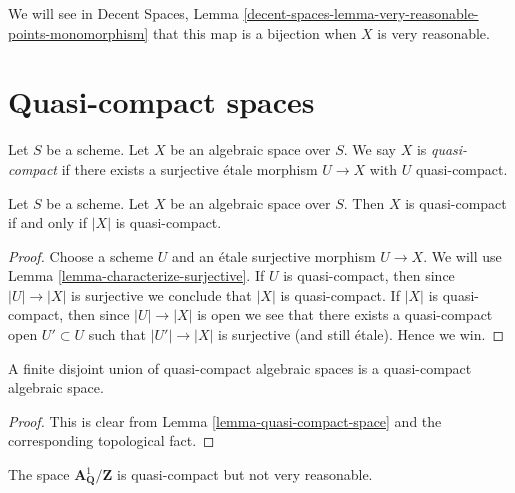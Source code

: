 \noindent
We will see in
Decent Spaces,
Lemma \ref{decent-spaces-lemma-very-reasonable-points-monomorphism}
that this map is a bijection when $X$ is very reasonable.

















\section{Quasi-compact spaces}
\label{section-quasi-compact}

\begin{definition}
\label{definition-quasi-compact}
Let $S$ be a scheme.
Let $X$ be an algebraic space over $S$.
We say $X$ is {\it quasi-compact} if there exists a surjective
\'etale morphism $U \to X$ with $U$ quasi-compact.
\end{definition}

\begin{lemma}
\label{lemma-quasi-compact-space}
Let $S$ be a scheme.
Let $X$ be an algebraic space over $S$.
Then $X$ is quasi-compact if and only if $|X|$ is quasi-compact.
\end{lemma}

\begin{proof}
Choose a scheme $U$ and an \'etale surjective morphism $U \to X$.
We will use Lemma \ref{lemma-characterize-surjective}.
If $U$ is quasi-compact, then since $|U| \to |X|$ is surjective
we conclude that $|X|$ is quasi-compact.
If $|X|$ is quasi-compact, then since $|U| \to |X|$ is open
we see that there exists a quasi-compact open $U' \subset U$
such that $|U'| \to |X|$ is surjective (and still \'etale).
Hence we win.
\end{proof}

\begin{lemma}
\label{lemma-finite-disjoint-quasi-compact}
A finite disjoint union of quasi-compact algebraic spaces is
a quasi-compact algebraic space.
\end{lemma}

\begin{proof}
This is clear from
Lemma \ref{lemma-quasi-compact-space}
and the corresponding topological fact.
\end{proof}

\begin{example}
\label{example-quasi-compact-not-very-reasonable}
The space $\mathbf{A}^1_{\mathbf{Q}}/\mathbf{Z}$ is
quasi-compact but not very reasonable.
\end{example}

